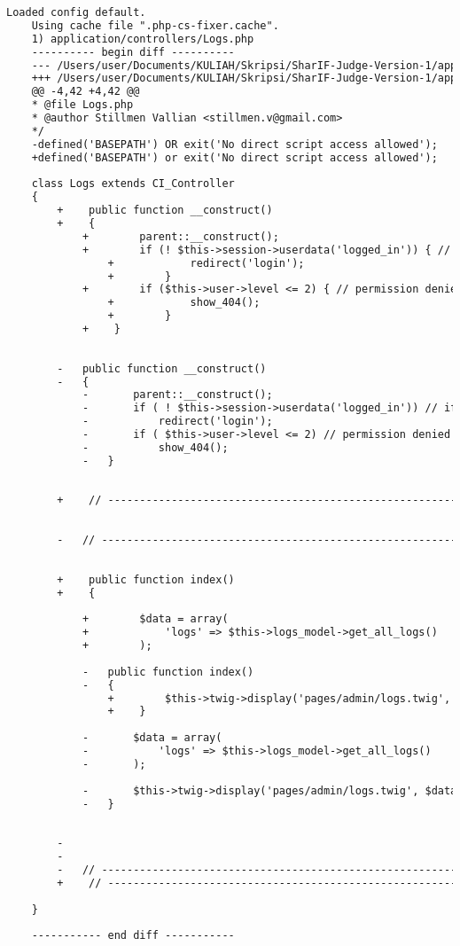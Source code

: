 \begin{lstlisting}[language=diff, caption=Perubahan pada kode Logs.php]
	Loaded config default.
	Using cache file ".php-cs-fixer.cache".
	1) application/controllers/Logs.php
	---------- begin diff ----------
	--- /Users/user/Documents/KULIAH/Skripsi/SharIF-Judge-Version-1/application/controllers/Logs.php
	+++ /Users/user/Documents/KULIAH/Skripsi/SharIF-Judge-Version-1/application/controllers/Logs.php
	@@ -4,42 +4,42 @@
	* @file Logs.php
	* @author Stillmen Vallian <stillmen.v@gmail.com>
	*/
	-defined('BASEPATH') OR exit('No direct script access allowed');
	+defined('BASEPATH') or exit('No direct script access allowed');
	
	class Logs extends CI_Controller
	{
		+    public function __construct()
		+    {
			+        parent::__construct();
			+        if (! $this->session->userdata('logged_in')) { // if not logged in
				+            redirect('login');
				+        }
			+        if ($this->user->level <= 2) { // permission denied
				+            show_404();
				+        }
			+    }
		
		
		-	public function __construct()
		-	{
			-		parent::__construct();
			-		if ( ! $this->session->userdata('logged_in')) // if not logged in
			-			redirect('login');
			-		if ( $this->user->level <= 2) // permission denied
			-			show_404();
			-	}
		
		
		+    // ------------------------------------------------------------------------
		
		
		-	// ------------------------------------------------------------------------
		
		
		+    public function index()
		+    {
			
			+        $data = array(
			+            'logs' => $this->logs_model->get_all_logs()
			+        );
			
			-	public function index()
			-	{
				+        $this->twig->display('pages/admin/logs.twig', $data);
				+    }
			
			-		$data = array(
			-			'logs' => $this->logs_model->get_all_logs()
			-		);
			
			-		$this->twig->display('pages/admin/logs.twig', $data);
			-	}
		
		
		-
		-
		-	// ------------------------------------------------------------------------
		+    // ------------------------------------------------------------------------
		
	}
	
	----------- end diff -----------
\end{lstlisting}

